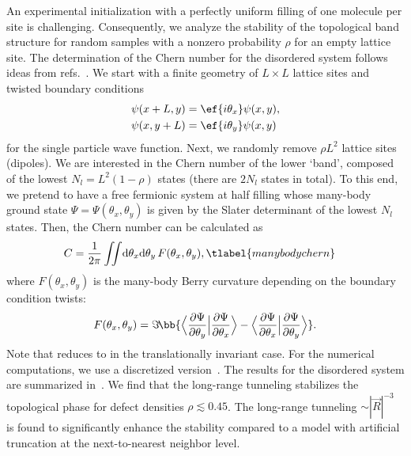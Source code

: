 An experimental initialization with a perfectly uniform filling of one molecule per site is challenging.
Consequently, we analyze the stability of the topological band structure for random samples with a nonzero probability $\rho$ for an empty lattice site.
The determination of the Chern number for the disordered system follows ideas from refs.~\cite{Niu1985,Avron1985}.
We start with a finite geometry of $L \times L$ lattice sites and twisted boundary conditions
\begin{align}
    \psi(x + L, y) &= \ef{i\theta_x}\psi(x, y), \\
    \psi(x, y + L) &= \ef{i\theta_y}\psi(x, y)
\end{align}
for the single particle wave function.
Next, we randomly remove $\rho L^2$ lattice sites (dipoles).
We are interested in the Chern number of the lower `band', composed of the lowest $N_l=L^2 (1-\rho)$ states (there are $2N_l$ states in total).
To this end, we pretend to have a free fermionic system at half filling whose many-body ground state $\Psi=\Psi(\theta_x, \theta_y)$ is given by the Slater determinant of the lowest $N_l$ states.
Then, the Chern number can be calculated as
\begin{align}
    C &= \frac{1}{2\pi}\iint\!\mathrm{d}\theta_x \mathrm{d}\theta_y \, F(\theta_x, \theta_y), \tlabel{manybodychern}
\end{align}
where $F(\theta_x, \theta_y)$ is the many-body Berry curvature depending on the boundary condition twists:
\begin{align}
    F(\theta_x,\theta_y)=\Im\!\bb{ {\Big\langle\frac{\partial \Psi}{\partial \theta_y}\Big|\frac{\partial \Psi}{\partial \theta_x}\Big\rangle - \Big\langle\frac{\partial \Psi}{\partial \theta_x}\Big|\frac{\partial \Psi}{\partial \theta_y}\Big\rangle} }.
\end{align}
Note that  reduces to  in the translationally invariant case.
For the numerical computations, we use a discretized version~\cite{Fukui2005}.
The results for the disordered system are summarized in~.
We find that the long-range tunneling stabilizes the topological phase for defect densities $\rho\lesssim 0.45$.
The long-range tunneling ${\sim}|\vec{R}|^{-3}$ is found to significantly enhance the stability compared to a model with artificial truncation at the next-to-nearest neighbor level.

